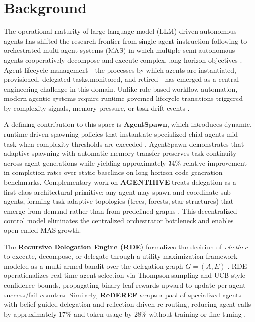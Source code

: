 \section{Background}


The operational maturity of large language model (LLM)-driven autonomous agents has shifted the research frontier from single-agent instruction following to orchestrated multi-agent systems (MAS) in which multiple semi-autonomous agents cooperatively decompose and execute complex, long-horizon objectives \cite{adaptive_multimodal_2025, cooperative_marl_2025}. Agent lifecycle management—the processes by which agents are instantiated, provisioned, delegated tasks,monitored, and retired—has emerged as a central engineering challenge in this domain. Unlike rule-based workflow automation, modern agentic systems require runtime-governed lifecycle transitions triggered by complexity signals, memory pressure, or task drift events \cite{mi9_runtime_2025}.

A defining contribution to this space is \textbf{AgentSpawn}, which introduces dynamic, runtime-driven spawning policies that instantiate specialized child agents mid-task when complexity thresholds are exceeded \cite{agentspawn_2025}. AgentSpawn demonstrates that adaptive spawning with automatic memory transfer preserves task continuity across agent generations while yielding approximately 34\% relative improvement in completion rates over static baselines on long-horizon code generation benchmarks. Complementary work on \textbf{AGENTHIVE} treats delegation as a first-class architectural primitive: any agent may spawn and coordinate sub-agents, forming task-adaptive topologies (trees, forests, star structures) that emerge from demand rather than from predefined graphs \cite{agenthive_2025}. This decentralized control model eliminates the centralized orchestrator bottleneck and enables open-ended MAS growth.

The \textbf{Recursive Delegation Engine (RDE)} formalizes the decision of \textit{whether} to execute, decompose, or delegate through a utility-maximization framework modeled as a multi-armed bandit over the delegation graph $G = (A, E)$ \cite{rde_2025}. RDE operationalizes real-time agent selection via Thompson sampling and UCB-style confidence bounds, propagating binary leaf rewards upward to update per-agent success/fail counters. Similarly, \textbf{ReDEREF} wraps a pool of specialized agents with belief-guided delegation and reflection-driven re-routing, reducing agent calls by approximately 17\% and token usage by 28\% without training or fine-tuning \cite{rederef_2026}.

